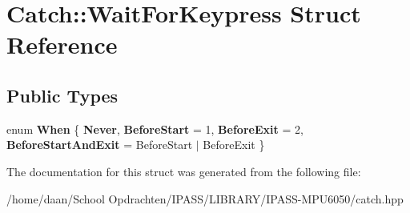 \hypertarget{structCatch_1_1WaitForKeypress}{}\section{Catch\+:\+:Wait\+For\+Keypress Struct Reference}
\label{structCatch_1_1WaitForKeypress}
\subsection*{Public Types}
\begin{DoxyCompactItemize}
\item 
\mbox{\label{structCatch_1_1WaitForKeypress_a2e8c4369d0a605d64e3e83b5af3399ba}} 
enum {\bfseries When} \{ {\bfseries Never}, 
{\bfseries Before\+Start} = 1, 
{\bfseries Before\+Exit} = 2, 
{\bfseries Before\+Start\+And\+Exit} = Before\+Start $\vert$ Before\+Exit
 \}
\end{DoxyCompactItemize}


The documentation for this struct was generated from the following file\+:\begin{DoxyCompactItemize}
\item 
/home/daan/\+School Opdrachten/\+I\+P\+A\+S\+S/\+L\+I\+B\+R\+A\+R\+Y/\+I\+P\+A\+S\+S-\/\+M\+P\+U6050/catch.\+hpp\end{DoxyCompactItemize}
